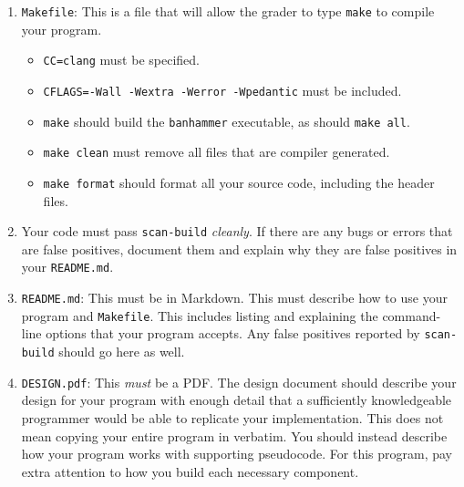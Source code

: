 \documentclass{article}
\begin{document}
\begin{enumerate}
  \item \texttt{Makefile}: This is a file that will allow the grader to
    type \texttt{make} to compile your program.

    \begin{itemize}
      \item \texttt{CC=clang} must be specified.
      \item \texttt{CFLAGS=-Wall -Wextra -Werror -Wpedantic}
        must be included.
      \item \texttt{make} should build the \texttt{banhammer}
        executable, as should \texttt{make all}.
      \item \texttt{make clean} must remove all files that are compiler
        generated.
      \item \texttt{make format} should format all your source code,
        including the header files.
    \end{itemize}

  \item Your code must pass \texttt{scan-build} \emph{cleanly}. If there
    are any bugs or errors that are false positives, document them and
    explain why they are false positives in your \texttt{README.md}.

  \item \texttt{README.md}: This must be in Markdown. This must describe
    how to use your program and \texttt{Makefile}. This includes listing
    and explaining the command-line options that your program accepts.
    Any false positives reported by \texttt{scan-build} should go here
    as well.

  \item \texttt{DESIGN.pdf}: This \emph{must} be a PDF. The design
    document should describe your design for your program with enough
    detail that a sufficiently knowledgeable programmer would be able to
    replicate your implementation. This does not mean copying your
    entire program in verbatim. You should instead describe how your
    program works with supporting pseudocode. For this program, pay
    extra attention to how you build each necessary component.


\end{enumerate}
\end{document}
